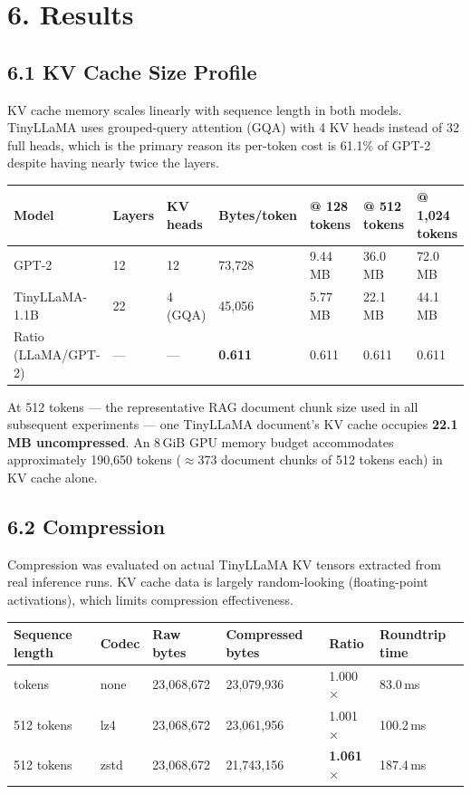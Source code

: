 \documentclass[11pt]{article}
\begin{document}
\section{6. Results}

\subsection{6.1 KV Cache Size Profile}

KV cache memory scales linearly with sequence length in both models.
TinyLLaMA uses grouped-query attention (GQA) with 4 KV heads instead of
32 full heads, which is the primary reason its per-token cost is 61.1\%
of GPT-2 despite having nearly twice the layers.

\begin{longtable}[]{@{}lllllll@{}}
\toprule
Model & Layers & KV heads & Bytes/token & @ 128 tokens & @ 512 tokens & @ 1,024 tokens \\
\midrule
\endhead
\bottomrule
\endlastfoot
GPT-2 & 12 & 12 & 73,728 & 9.44\,MB & 36.0\,MB & 72.0\,MB \\
TinyLLaMA-1.1B & 22 & 4 (GQA) & 45,056 & 5.77\,MB & 22.1\,MB & 44.1\,MB \\
Ratio (LLaMA/GPT-2) & --- & --- & \textbf{0.611} & 0.611 & 0.611 & 0.611 \\
\end{longtable}

At 512 tokens --- the representative RAG document chunk size used in all
subsequent experiments --- one TinyLLaMA document's KV cache occupies
\textbf{22.1\,MB uncompressed}. An 8\,GiB GPU memory budget accommodates
approximately 190,650 tokens ($\approx$373 document chunks of 512 tokens each)
in KV cache alone.

\subsection{6.2 Compression}

Compression was evaluated on actual TinyLLaMA KV tensors extracted from
real inference runs. KV cache data is largely random-looking
(floating-point activations), which limits compression effectiveness.

\begin{longtable}[]{@{}llllll@{}}
\toprule
Sequence length & Codec & Raw bytes & Compressed bytes & Ratio & Roundtrip time \\
\midrule
\endhead
\bottomrule
\endlastfoot
512 tokens & none  & 23,068,672 & 23,079,936 & 1.000$\times$ & 83.0\,ms \\
512 tokens & lz4   & 23,068,672 & 23,061,956 & 1.001$\times$ & 100.2\,ms \\
512 tokens & zstd  & 23,068,672 & 21,743,156 & \textbf{1.061$\times$} & 187.4\,ms \\
\end{longtable}
\end{document}
